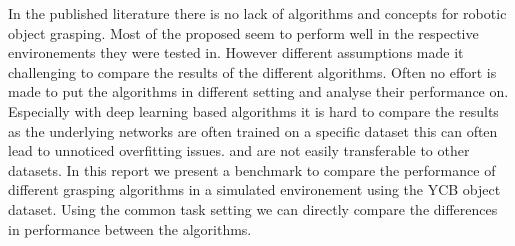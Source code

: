 In the published literature there is no lack of algorithms and concepts for robotic object grasping.
Most of the proposed seem to perform well in the respective environements they were tested in.%
However different assumptions made it challenging to compare the results of the different algorithms.
Often no effort is made to put the algorithms in different setting and analyse their performance on.
Especially with deep learning based algorithms it is hard to compare the results as the underlying networks are often trained on a specific dataset
this can often lead to unnoticed overfitting issues. and are not easily transferable to other datasets.
In this report we present a benchmark to compare the performance of different grasping algorithms in a simulated environement using the YCB object dataset.
Using the common task setting we can directly compare the differences in performance between the algorithms.

